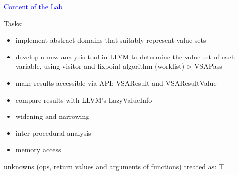 \begin{frame}[fragile]{\textcolor{blue}{Content of the Lab}}

\underline{Tasks:}
\begin{itemize}
\item implement {\color{blue}abstract domain}s that suitably represent value sets
\item develop a new analysis tool in LLVM to determine the value set of each \\
\qquad variable, using visitor and fixpoint algorithm (worklist) $\triangleright$ {\color{blue} VSAPass}
\item make results accessible via API: {\color{blue} VSAResult} and {\color{blue} VSAResultValue}
\item compare results with LLVM's {\color{blue} LazyValueInfo}
\end{itemize}

\vspace{1cm}

\underline{}
\begin{itemize}
\item widening and narrowing
\item inter-procedural analysis
\item memory access 
\end{itemize}
\hfill unknowns (ops, return values and arguments of functions) treated as: {\color{blue} $\top$}

\end{frame}
